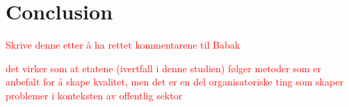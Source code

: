 \chapter{Conclusion} \label{sec:conclusion}
\textcolor{red}{Skrive denne etter å ha rettet kommentarene til Babak}

\textcolor{red}{det virker som at etatene (ivertfall i denne studien) følger metoder som er anbefalt for å skape kvalitet, men det er en del organisatoriske ting som skaper problemer i konteksten av offentlig sektor}
